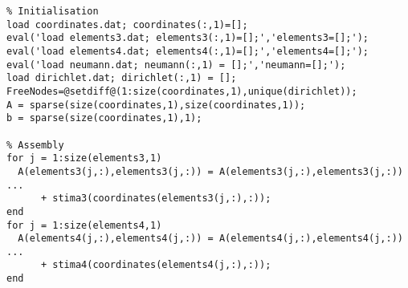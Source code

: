 \usepackage{listings}

\begin{lstlisting}[firstnumber=1,caption={Short caption},label={label}]
%FEM2D two-dimensional finite element method for Laplacian.
% Initialisation
load coordinates.dat; coordinates(:,1)=[];
eval('load elements3.dat; elements3(:,1)=[];','elements3=[];');
eval('load elements4.dat; elements4(:,1)=[];','elements4=[];');
eval('load neumann.dat; neumann(:,1) = [];','neumann=[];');
load dirichlet.dat; dirichlet(:,1) = [];
FreeNodes=@setdiff@(1:size(coordinates,1),unique(dirichlet));
A = sparse(size(coordinates,1),size(coordinates,1));
b = sparse(size(coordinates,1),1);

% Assembly
for j = 1:size(elements3,1)
  A(elements3(j,:),elements3(j,:)) = A(elements3(j,:),elements3(j,:)) ...
      + stima3(coordinates(elements3(j,:),:));
end
for j = 1:size(elements4,1)
  A(elements4(j,:),elements4(j,:)) = A(elements4(j,:),elements4(j,:)) ...
      + stima4(coordinates(elements4(j,:),:));
end
\end{lstlisting}
